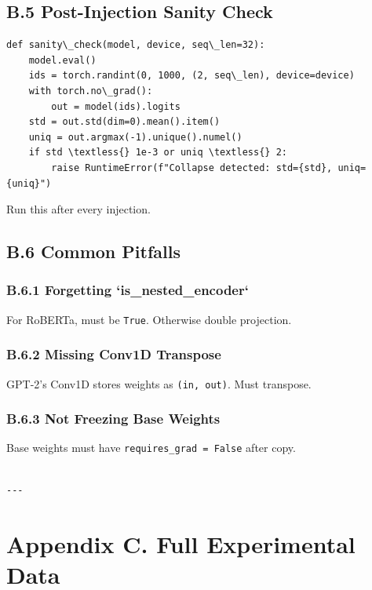 \subsection{B.5 Post-Injection Sanity Check}

\begin{lstlisting}
def sanity\_check(model, device, seq\_len=32):
    model.eval()
    ids = torch.randint(0, 1000, (2, seq\_len), device=device)
    with torch.no\_grad():
        out = model(ids).logits
    std = out.std(dim=0).mean().item()
    uniq = out.argmax(-1).unique().numel()
    if std \textless{} 1e-3 or uniq \textless{} 2:
        raise RuntimeError(f"Collapse detected: std={std}, uniq={uniq}")
\end{lstlisting}

Run this after every injection.

\subsection{B.6 Common Pitfalls}

\subsubsection{B.6.1 Forgetting `is\_nested\_encoder`}

For RoBERTa, must be \texttt{True}. Otherwise double projection.

\subsubsection{B.6.2 Missing Conv1D Transpose}

GPT-2's Conv1D stores weights as \texttt{(in, out)}. Must transpose.

\subsubsection{B.6.3 Not Freezing Base Weights}

Base weights must have \texttt{requires\_grad = False} after copy.
\begin{lstlisting}

---
\end{lstlisting}


\section{Appendix C. Full Experimental Data}

